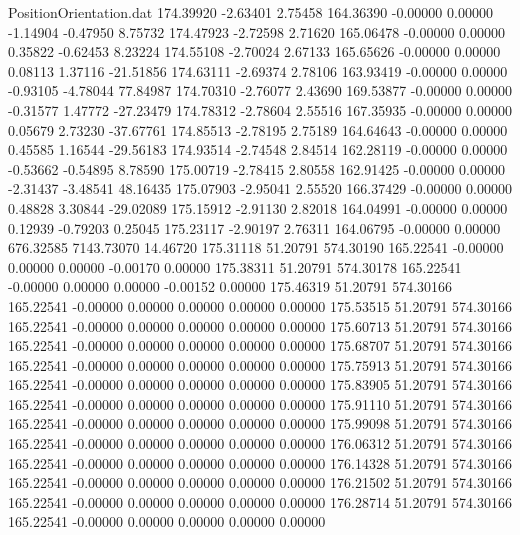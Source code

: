 \begin{filecontents}{PositionOrientation.dat}
 174.39920   -2.63401    2.75458   164.36390   -0.00000    0.00000   -1.14904   -0.47950    8.75732
 174.47923   -2.72598    2.71620   165.06478   -0.00000    0.00000    0.35822   -0.62453    8.23224
 174.55108   -2.70024    2.67133   165.65626   -0.00000    0.00000    0.08113    1.37116  -21.51856
 174.63111   -2.69374    2.78106   163.93419   -0.00000    0.00000   -0.93105   -4.78044   77.84987
 174.70310   -2.76077    2.43690   169.53877   -0.00000    0.00000   -0.31577    1.47772  -27.23479
 174.78312   -2.78604    2.55516   167.35935   -0.00000    0.00000    0.05679    2.73230  -37.67761
 174.85513   -2.78195    2.75189   164.64643   -0.00000    0.00000    0.45585    1.16544  -29.56183
 174.93514   -2.74548    2.84514   162.28119   -0.00000    0.00000   -0.53662   -0.54895    8.78590
 175.00719   -2.78415    2.80558   162.91425   -0.00000    0.00000   -2.31437   -3.48541   48.16435
 175.07903   -2.95041    2.55520   166.37429   -0.00000    0.00000    0.48828    3.30844  -29.02089
 175.15912   -2.91130    2.82018   164.04991   -0.00000    0.00000    0.12939   -0.79203    0.25045
 175.23117   -2.90197    2.76311   164.06795   -0.00000    0.00000  676.32585 7143.73070   14.46720
 175.31118   51.20791  574.30190   165.22541   -0.00000    0.00000    0.00000   -0.00170    0.00000
 175.38311   51.20791  574.30178   165.22541   -0.00000    0.00000    0.00000   -0.00152    0.00000
 175.46319   51.20791  574.30166   165.22541   -0.00000    0.00000    0.00000    0.00000    0.00000
 175.53515   51.20791  574.30166   165.22541   -0.00000    0.00000    0.00000    0.00000    0.00000
 175.60713   51.20791  574.30166   165.22541   -0.00000    0.00000    0.00000    0.00000    0.00000
 175.68707   51.20791  574.30166   165.22541   -0.00000    0.00000    0.00000    0.00000    0.00000
 175.75913   51.20791  574.30166   165.22541   -0.00000    0.00000    0.00000    0.00000    0.00000
 175.83905   51.20791  574.30166   165.22541   -0.00000    0.00000    0.00000    0.00000    0.00000
 175.91110   51.20791  574.30166   165.22541   -0.00000    0.00000    0.00000    0.00000    0.00000
 175.99098   51.20791  574.30166   165.22541   -0.00000    0.00000    0.00000    0.00000    0.00000
 176.06312   51.20791  574.30166   165.22541   -0.00000    0.00000    0.00000    0.00000    0.00000
 176.14328   51.20791  574.30166   165.22541   -0.00000    0.00000    0.00000    0.00000    0.00000
 176.21502   51.20791  574.30166   165.22541   -0.00000    0.00000    0.00000    0.00000    0.00000
 176.28714   51.20791  574.30166   165.22541   -0.00000    0.00000    0.00000    0.00000    0.00000

\end{filecontents}
